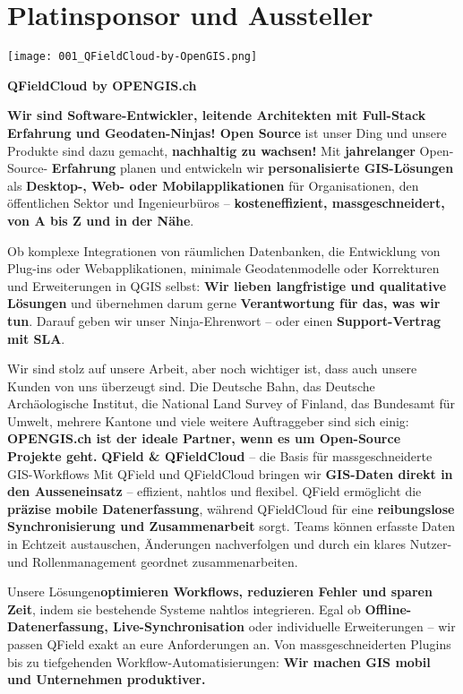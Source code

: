 \cleardoubleevenpage
\section*{Platinsponsor und Aussteller}
\begin{flushright}
\texttt{[image: 001\_QFieldCloud-by-OpenGIS.png]}
\end{flushright}
\vspace{0.5cm}

\noindent
    {\bfseries QFieldCloud by OPENGIS.ch}
    \vspace{1.0\baselineskip}
    
 \noindent   
    {\bfseries Wir sind Software-Entwickler, leitende Architekten mit Full-Stack Erfahrung und Geodaten-Ninjas!
      Open Source} ist unser Ding und unsere Produkte sind dazu gemacht,  {\bfseries nachhaltig zu wachsen!}
    Mit {\bfseries jahrelanger} Open-Source- {\bfseries Erfahrung} planen und entwickeln wir {\bfseries personalisierte GIS-Lösungen}
    als {\bfseries Desktop-, Web- oder Mobilapplikationen} für Organisationen, den öffentlichen Sektor und Ingenieurbüros –
    {\bfseries kosteneffizient, massgeschneidert, von A bis Z und in der Nähe}. 

\noindent
Ob komplexe Integrationen von räumlichen Datenbanken, die Entwicklung von Plug-ins oder Webapplikationen, minimale Geodatenmodelle
oder Korrekturen und Erweiterungen in QGIS selbst: {\bfseries Wir lieben langfristige und qualitative Lösungen} und übernehmen darum
gerne {\bfseries Verantwortung für das, was wir tun}. Darauf geben wir unser Ninja-Ehrenwort – oder einen {\bfseries Support-Vertrag mit SLA}.

\noindent
Wir sind stolz auf unsere Arbeit, aber noch wichtiger ist, dass auch unsere Kunden von uns überzeugt sind. Die Deutsche Bahn, das Deutsche
Archäologische Institut, die National Land Survey of Finland, das Bundesamt für Umwelt, mehrere Kantone und viele weitere Auftraggeber
sind sich einig: {\bfseries OPENGIS.ch ist der ideale Partner, wenn es um Open-Source Projekte geht.}
\newpage
\noindent
{\bfseries QField \& QFieldCloud} – die Basis für massgeschneiderte GIS-Workflows   
Mit QField und QFieldCloud bringen wir {\bfseries GIS-Daten direkt in den Ausseneinsatz} – effizient, nahtlos und flexibel. QField
ermöglicht die {\bfseries präzise mobile Datenerfassung}, während QFieldCloud für eine {\bfseries reibungslose Synchronisierung
  und Zusammenarbeit} sorgt. Teams können erfasste Daten in Echtzeit austauschen, Änderungen nachverfolgen und durch ein
klares Nutzer- und Rollenmanagement geordnet zusammenarbeiten.  

\noindent
Unsere Lösungen{\bfseries  optimieren Workflows, reduzieren Fehler und sparen Zeit}, indem sie bestehende Systeme nahtlos integrieren.
Egal ob {\bfseries Offline-Datenerfassung, Live-Synchronisation} oder individuelle Erweiterungen – wir passen QField exakt an eure
Anforderungen an. Von massgeschneiderten Plugins bis zu tiefgehenden Workflow-Automatisierungen:
{\bfseries Wir machen GIS mobil und Unternehmen produktiver.}

